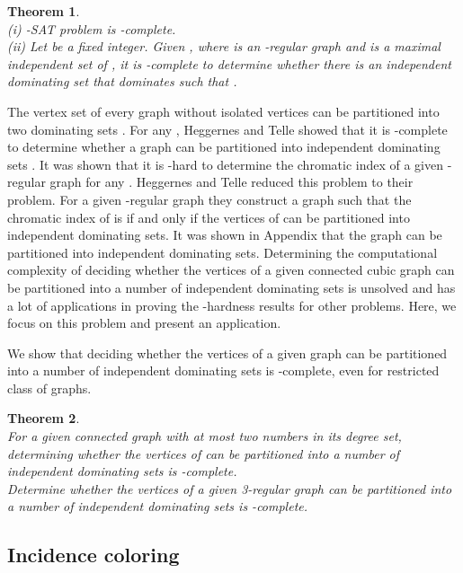 \documentclass[
final
]{dmtcs-episciences}
\newtheorem{prethm}{{\bf Theorem}}
\newenvironment{thm}{\begin{prethm}{\hspace{-0.5
				em}{\bf}}}{\end{prethm}}
\begin{document}
\begin{thm}\label{thm1}\\
	(i) -SAT problem is -complete.\\
	(ii) Let  be a fixed integer. Given , where  is an -regular graph and  is  a  maximal independent set of , it  is -complete to determine whether
	there is an independent dominating set  that dominates  such that .
\end{thm}


The vertex set of every graph without isolated vertices can be
partitioned into two dominating sets \cite{ID3}.
For any  , Heggernes and Telle   showed that it is -complete to determine whether a graph can
be partitioned into  independent dominating sets \cite{HT}.
It was shown that it is -hard to determine the chromatic index of a given -regular graph for any  \cite{MR689264}. Heggernes and Telle  reduced this problem to their problem. For a given -regular graph  they construct a graph  such that the chromatic index of  is  if and only if the vertices of   can be partitioned into  independent dominating sets.
It was shown in Appendix that the graph  can be partitioned into  independent dominating sets. Determining the computational complexity of deciding whether the vertices of a given connected cubic graph  can be partitioned into a number of independent dominating sets is unsolved and has a lot of applications in proving the  -hardness results for other problems.
Here, we focus on this problem and present an application.

We show that deciding whether the vertices of a given  graph  can be partitioned into a number of  independent dominating sets is  -complete, even for restricted class of graphs.

\begin{thm}\label{thm4}
	\\
	 For a given connected graph  with at most two numbers in its degree set, determining  whether the vertices of  can be partitioned into a number of independent dominating sets is  -complete.\\
	 Determine  whether the vertices of a given  3-regular graph can be partitioned into a number of independent dominating sets is  -complete.
\end{thm}


\subsection{Incidence coloring}
\end{document}
